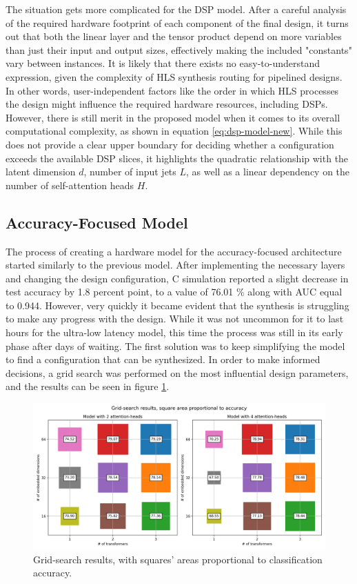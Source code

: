 The situation gets more complicated for the DSP model. After a careful analysis of the required hardware footprint of each component of the final design, it turns out that both the linear layer and the tensor product depend on more variables than just their input and output sizes, effectively making the included "constants" vary between instances. It is likely that there exists no easy-to-understand expression, given the complexity of HLS synthesis routing for pipelined designs. In other words, user-independent factors like the order in which HLS processes the design might influence the required hardware resources, including DSPs. However, there is still merit in the proposed model when it comes to its overall computational complexity, as shown in equation \ref{eq:dsp-model-new}. While this does not provide a clear upper boundary for deciding whether a configuration exceeds the available DSP slices, it highlights the quadratic relationship with the latent dimension \(d\), number of input jets \(L\), as well as a linear dependency on the number of self-attention heads \(H\).

\subsection{Accuracy-Focused Model}
The process of creating a hardware model for the accuracy-focused architecture started similarly to the previous model. After implementing the necessary layers and changing the design configuration, C simulation reported a slight decrease in test accuracy by 1.8 percent point, to a value of 76.01 \% along with AUC equal to 0.944. However, very quickly it became evident that the synthesis is struggling to make any progress with the design. While it was not uncommon for it to last hours for the ultra-low latency model, this time the process was still in its early phase after days of waiting. The first solution was to keep simplifying the model to find a configuration that can be synthesized. In order to make informed decisions, a grid search was performed on the most influential design parameters, and the results can be seen in figure \ref{fig:grid-search}.

\begin{figure}[hpt!]
  \centering
  \includegraphics[trim={0cm 0cm 0cm 0cm}, clip, width=1.0\textwidth, center]{../logs/grid_search.png}
  \caption{Grid-search results, with squares' areas proportional to classification accuracy.}
  \label{fig:grid-search}
\end{figure}


